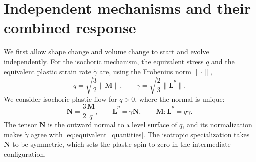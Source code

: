 \documentclass[11pt]{article}
\newcommand{\mbf}[1]{\mathbf{#1}}
\begin{document}
\section{Independent mechanisms and their combined response}
\label{sec:two_mechanisms}

We first allow shape change and volume change to start and evolve
independently. For the isochoric mechanism, the equivalent stress \(q\) and the
equivalent plastic strain rate \(\dot\gamma\) are, using the Frobenius norm
\(\lVert\cdot\rVert\),
\begin{equation}
	q=\sqrt{\frac{3}{2}}\lVert\mbf M\rVert,
	\qquad
	\dot\gamma=\sqrt{\frac{2}{3}}
	\lVert\bar{\mbf L}^{p}\rVert.
	\label{eq:equivalent_quantities}
\end{equation}
We consider isochoric plastic flow for \(q>0\), where the normal is unique:
\begin{equation}
	\mbf N=\frac{3}{2}\frac{\mbf M}{q},
	\qquad
	\bar{\mbf L}^{p}=\dot\gamma\mbf N,
	\qquad
	\mbf M:\bar{\mbf L}^{p}=q\dot\gamma.
	\label{eq:deviatoric_normal}
\end{equation}
The tensor \(\mbf N\) is the outward normal to a level surface of \(q\), and
its normalization makes \(\dot\gamma\) agree with
\eqref{eq:equivalent_quantities}.  The isotropic specialization takes
\(\mbf N\) to be symmetric, which sets the plastic spin to zero in the
intermediate configuration.
\end{document}
